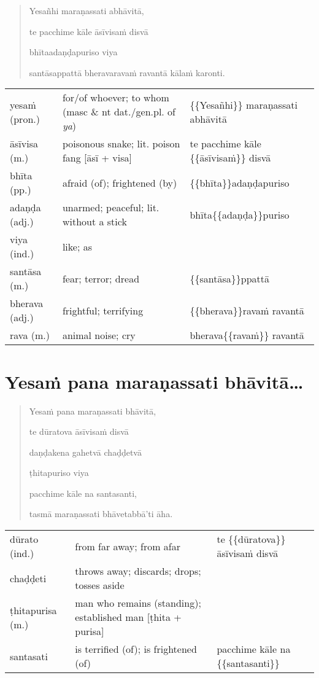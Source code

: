 \documentclass[11pt,oneside]{memoir}
\begin{document}
\begin{quote}
Yesañhi maraṇassati abhāvitā,

te pacchime kāle āsīvisaṁ disvā

bhītaadaṇḍapuriso viya

santāsappattā bheravaravaṁ ravantā kālaṁ karonti.
\end{quote}

\begin{longtable}{L{\colOne} L{\colTwo} H}
yesaṁ (pron.) & for/of whoever; to whom (masc \& nt dat./gen.pl. of \emph{ya}) & \{\{Yesañhi\}\} maraṇassati abhāvitā\\[0pt]
āsīvisa (m.) & poisonous snake; lit. poison fang [āsī + visa] & te pacchime kāle \{\{āsīvisaṁ\}\} disvā\\[0pt]
bhīta (pp.) & afraid (of); frightened (by) & \{\{bhīta\}\}adaṇḍapuriso\\[0pt]
adaṇḍa (adj.) & unarmed; peaceful; lit. without a stick & bhīta\{\{adaṇḍa\}\}puriso\\[0pt]
viya (ind.) & like; as & \\[0pt]
santāsa (m.) & fear; terror; dread & \{\{santāsa\}\}ppattā\\[0pt]
bherava (adj.) & frightful; terrifying & \{\{bherava\}\}ravaṁ ravantā\\[0pt]
rava (m.) & animal noise; cry & bherava\{\{ravaṁ\}\} ravantā\\[0pt]
\end{longtable}

\clearpage

\section{Yesaṁ pana maraṇassati bhāvitā\ldots{}}
\label{sec:org8f68a82}

\begin{quote}
Yesaṁ pana maraṇassati bhāvitā,

te dūratova āsīvisaṁ disvā

daṇḍakena gahetvā chaḍḍetvā

ṭhitapuriso viya

pacchime kāle na santasanti,

tasmā maraṇassati bhāvetabbā'ti āha.
\end{quote}

\begin{longtable}{L{\colOne} L{\colTwo} H}
dūrato (ind.) & from far away; from afar & te \{\{dūratova\}\} āsīvisaṁ disvā\\[0pt]
chaḍḍeti & throws away; discards; drops; tosses aside & \\[0pt]
ṭhitapurisa (m.) & man who remains (standing); established man [ṭhita + purisa] & \\[0pt]
santasati & is terrified (of); is frightened (of) & pacchime kāle na \{\{santasanti\}\}\\[0pt]
\end{longtable}
\end{document}
